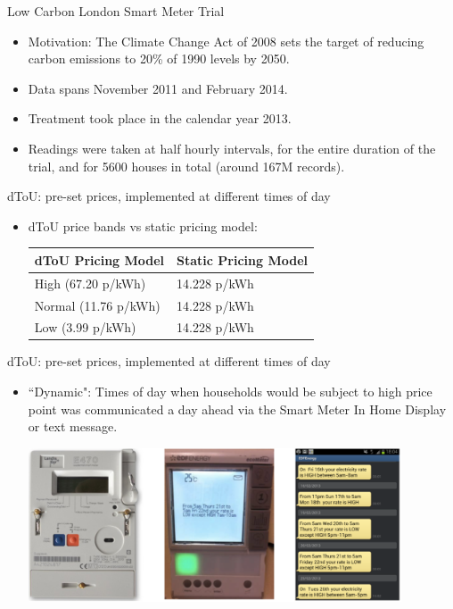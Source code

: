 \documentclass{beamer}
\begin{document}
\begin{frame}{Low Carbon London Smart Meter Trial}
  \begin{itemize}
    \item<+-> Motivation: The Climate Change Act of 2008 sets the target of reducing carbon emissions to 20\% of 1990 levels by 2050.
    \item<+-> Data spans November 2011 and February 2014.
    \item<+-> Treatment took place in the calendar year 2013.
    \item<+-> Readings were taken at half hourly intervals, for the entire duration of the trial, and for 5600 houses in total (around 167M records).
  \end{itemize}
\end{frame}

\begin{frame}{dToU: pre-set prices, implemented at different times of day}
  \begin{itemize}
    \item<+-> dToU price bands vs static pricing model:
    \begin{table}[]
      \vspace{0.2cm}
      \centering
      \begin{tabular}{|l|l|}
        \hline
        dToU Pricing Model & Static Pricing Model \\ \hline
        High (67.20 p/kWh) & 14.228 p/kWh \\ \hline
        Normal (11.76 p/kWh) & 14.228 p/kWh \\ \hline
        Low (3.99 p/kWh) & 14.228 p/kWh \\ \hline
      \end{tabular}
    \end{table}
  \end{itemize}
\end{frame}

\begin{frame}{dToU: pre-set prices, implemented at different times of day}
  \begin{itemize}
    \item<+-> ``Dynamic": Times of day when households would be subject to high price point was communicated a day ahead via the Smart Meter In Home Display or text message.
    \vspace{0.3cm}
    \begin{center}
    \includegraphics[width=0.87\textwidth]{images/day-ahead-pricing.png}
    \end{center}
  \end{itemize}
\end{frame}
\end{document}
